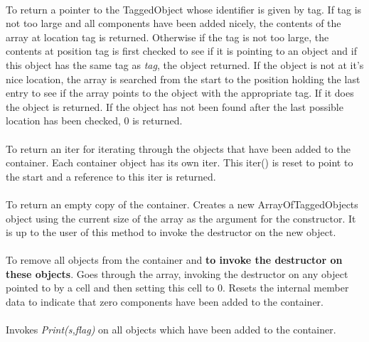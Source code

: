\\
To return a pointer to the TaggedObject whose identifier is given by
\p tag. If tag is not too large
and all components have been added nicely, the contents of the array
at location \p tag is returned. Otherwise if the tag is not too
large, the contents at position \p tag is first checked to see if it
is pointing to an object and if this object has the same tag as {\em
tag}, the object returned. If 
the object is not at it's nice location, the array is searched from
the start to the position holding the last entry to see if the array
points to the object with the appropriate tag. If it does the object
is returned. If the object has not been found after the last possible
location has been checked, $0$ is returned. \\


\\
To return an iter for iterating through the objects that have been
added to the container. Each container object has its own iter. This
iter() is reset to point to the start and a reference to this iter is
returned.\\ 

\\
To return an empty copy of the container. Creates a new
ArrayOfTaggedObjects object using the current size of the array as the
argument for the constructor. It is up to the user of this method to
invoke the destructor on the new object. \\

\\
To remove all objects from the container and {\bf to invoke the
destructor on these objects}. Goes through the array, invoking the
destructor on any object pointed to by a cell and then setting this
cell to $0$. Resets the internal member data to indicate that zero
components have been added to the container.\\

\\
Invokes {\em Print(s,flag)} on all objects which have been added to
the container. 






